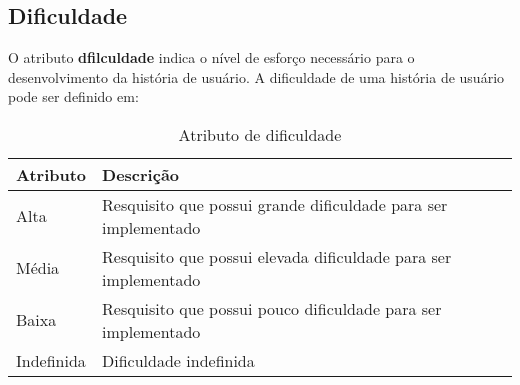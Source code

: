 	\subsection{Dificuldade}
	O atributo \textbf{dfilculdade} indica o nível de esforço necessário para o desenvolvimento da história de usuário. A dificuldade de uma história de usuário pode ser definido em:

	\begin{table}[htbp]
		\centering
		\begin{tabular}{|l|l|}
			\hline
			\textbf{Atributo} & \textbf{Descrição} \\ \hline
			Alta & Resquisito que possui grande dificuldade para ser implementado \\ \hline
			Média & Resquisito que possui elevada dificuldade para ser implementado \\ \hline
			Baixa & Resquisito que possui pouco dificuldade para ser implementado \\ \hline
			Indefinida & Dificuldade indefinida \\ \hline
		\end{tabular}
	\caption{Atributo de dificuldade}
	\label{Atributo de dificuldade}
	\end{table}

	